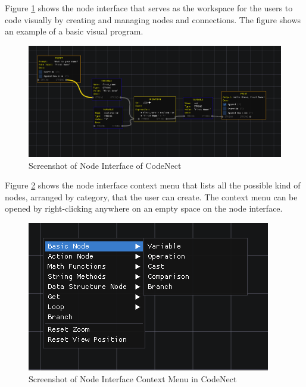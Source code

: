 \parx
Figure \ref{fig:cn_node_interface} shows the node interface that serves as the
workspace for the users to code visually by creating and managing nodes and
connections. The figure shows an example of a basic visual program.

\begin{figure}[H]
	\centering
	\captionsetup{justification=centering}
	\captionsetup[figure]{list=yes}
	\includegraphics[width=\linewidth]{media/sc_node_interface.png}
	\caption[Screenshot of Node Interface of CodeNect]{Screenshot of Node Interface of CodeNect}
	\label{fig:cn_node_interface}
\end{figure}

\parx
Figure \ref{fig:cn_node_context} shows the node interface context menu that
lists all the possible kind of nodes, arranged by category, that the user can
create. The context menu can be opened by right-clicking anywhere on an empty
space on the node interface.

\begin{figure}[H]
	\centering
	\captionsetup{justification=centering}
	\captionsetup[figure]{list=yes}
	\includegraphics[width=\linewidth]{media/sc_node_interface_context.png}
	\caption[Screenshot of Node Interface Context Menu in CodeNect]{Screenshot of Node Interface Context Menu in CodeNect}
	\label{fig:cn_node_context}
\end{figure}

